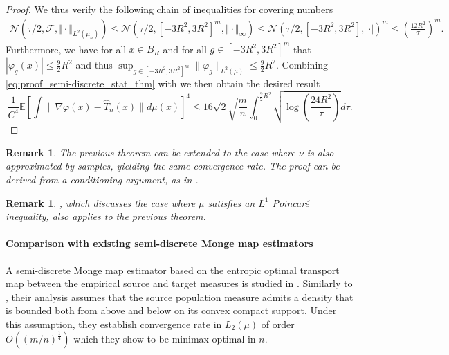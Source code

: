 \documentclass[11pt]{article}
\newtheorem{remark}[lemma]{Remark}
\newcommand{\1}{\mathbbm{1}}
\numberwithin{equation}{section}
\begin{document}
\begin{proof}
    We thus verify the following chain of inequalities for covering numbers
    \begin{align*}
            \mathcal{N}(\tau/2,\mathcal{F},\Vert\cdot\Vert_{L^2(\mu_n)}) \leq  \mathcal{N}(\tau/2,[-3R^2,3R^2]^m,\Vert\cdot\Vert_{\infty}) 
            \leq \mathcal{N}(\tau/2,\left[-3R^2,3R^2\right],\vert\cdot\vert)^m \leq\left(\frac{12R^2}{\tau} \right)^m.
    \end{align*}
    Furthermore, we have for all $x\in B_R$ and for all $g\in [-3R^2,3R^2]^m$ that $|\varphi_g(x)|\leq \frac{9}{2}R^2$ and thus $\sup_{g\in[-3R^2,3R^2]^m}\|\varphi_g\|_{L^2(\mu)}\leq \frac{9}{2}R^2$. Combining \eqref{eq:proof_semi-discrete_stat_thm} with \cite[Theorem 3.5.1]{gine2021mathematical} we then obtain the desired result
    \begin{equation*}
    \frac{1}{C^4}\mathbb{E}\left[\int \|\nabla \bar{\varphi}(x)-\hat{T}_n(x) \|d\mu(x) \right] ^4\leq 16\sqrt{2}\sqrt{\frac{m}{n}}\int_{0}^{\frac{9}{2}R^2}\sqrt{\log\left(\frac{24R^2}{\tau}\right)}d\tau.
    \end{equation*}
\end{proof}

\begin{remark}
    The previous theorem can be extended to the case where $\nu$ is also approximated by samples, yielding the same convergence rate. The proof can be derived from a conditioning argument, as in \cite[Appendix F]{pooladian2023minimax}.
\end{remark}
\begin{remark}
    , which discusses the case where $\mu$ satisfies an $L^1$ Poincaré inequality, also applies to the previous theorem.
\end{remark}

\paragraph{Comparison with existing semi-discrete Monge map estimators} 
A semi-discrete Monge map estimator based on the entropic optimal transport map between the empirical source and target measures is studied in \cite{pooladian2023minimax}. Similarly to , their analysis assumes that the source population measure admits a density that is bounded both from above and below on its convex compact support. Under this assumption, they establish convergence rate in  $L_2(\mu)$ of order $O\left(\left(m/n\right)^{\frac{1}{4}}\right)$   which they show to be minimax optimal in $n$.
\end{document}
